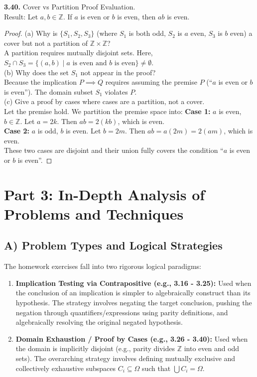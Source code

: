 \documentclass[11pt]{article}
\begin{document}
\textbf{3.40.} Cover vs Partition Proof Evaluation. \\
Result: Let $a, b \in \mathbb{Z}$. If $a$ is even or $b$ is even, then $ab$ is even. 
\begin{proof}
(a) Why is $\{S_1, S_2, S_3\}$ (where $S_1$ is both odd, $S_2$ is $a$ even, $S_3$ is $b$ even) a cover but not a partition of $\mathbb{Z} \times \mathbb{Z}$? \\
A partition requires mutually disjoint sets. Here, $S_2 \cap S_3 = \{(a,b) \mid a \text{ is even and } b \text{ is even}\} \neq \emptyset$. \\
(b) Why does the set $S_1$ not appear in the proof? \\
Because the implication $P \implies Q$ requires assuming the premise $P$ (``$a$ is even or $b$ is even''). The domain subset $S_1$ violates $P$. \\
(c) Give a proof by cases where cases are a partition, not a cover. \\
Let the premise hold. We partition the premise space into:
\textbf{Case 1:} $a$ is even, $b \in \mathbb{Z}$. Let $a = 2k$. Then $ab = 2(kb)$, which is even. \\
\textbf{Case 2:} $a$ is odd, $b$ is even. Let $b = 2m$. Then $ab = a(2m) = 2(am)$, which is even. \\
These two cases are disjoint and their union fully covers the condition ``$a$ is even or $b$ is even''.
\end{proof}

\newpage
\section{Part 3: In-Depth Analysis of Problems and Techniques}

\subsection{A) Problem Types and Logical Strategies}
The homework exercises fall into two rigorous logical paradigms:
\begin{enumerate}
    \item \textbf{Implication Testing via Contrapositive (e.g., 3.16 - 3.25):} Used when the conclusion of an implication is simpler to algebraically construct than its hypothesis. The strategy involves negating the target conclusion, pushing the negation through quantifiers/expressions using parity definitions, and algebraically resolving the original negated hypothesis.
    \item \textbf{Domain Exhaustion / Proof by Cases (e.g., 3.26 - 3.40):} Used when the domain is implicitly disjoint (e.g., parity divides $\mathbb{Z}$ into even and odd sets). The overarching strategy involves defining mutually exclusive and collectively exhaustive subspaces $C_i \subseteq \Omega$ such that $\bigcup C_i = \Omega$. 
\end{enumerate}
\end{document}
